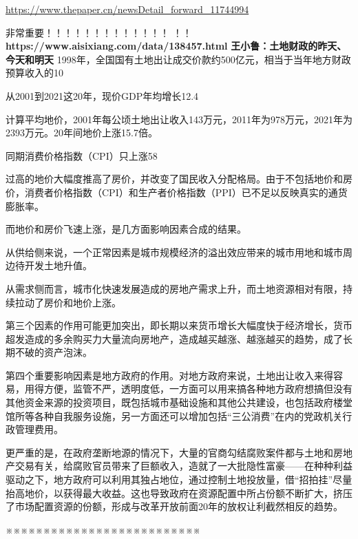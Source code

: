 \url{https://www.thepaper.cn/newsDetail_forward_11744994}


非常重要！！！！！！！！！！！！！
！！\textbf{https://www.aisixiang.com/data/138457.html}
\textbf{王小鲁：土地财政的昨天、今天和明天}
1998年，全国国有土地出让成交价款约500亿元，相当于当年地方财政预算收入的10%

从2001到2021这20年，现价GDP年均增长12.4%

计算平均地价，2001年每公顷土地出让收入143万元，2011年为978万元，2021年为2393万元。20年间地价上涨15.7倍。

同期消费价格指数（CPI）只上涨58%

过高的地价大幅度推高了房价，并改变了国民收入分配格局。由于不包括地价和房价，消费者价格指数（CPI）和生产者价格指数（PPI）已不足以反映真实的通货膨胀率。

而地价和房价飞速上涨，是几方面影响因素合成的结果。

从供给侧来说，一个正常因素是城市规模经济的溢出效应带来的城市用地和城市周边待开发土地升值。

从需求侧而言，城市化快速发展造成的房地产需求上升，而土地资源相对有限，持续拉动了房价和地价上涨。

第三个因素的作用可能更加突出，即长期以来货币增长大幅度快于经济增长，货币超发造成的多余购买力大量流向房地产，造成越买越涨、越涨越买的趋势，成了长期不破的资产泡沫。

第四个重要影响因素是地方政府的作用。对地方政府来说，土地出让收入来得容易，用得方便，监管不严，透明度低，一方面可以用来搞各种地方政府想搞但没有其他资金来源的投资项目，既包括城市基础设施和其他公共建设，也包括政府楼堂馆所等各种自我服务设施，另一方面还可以增加包括“三公消费”在内的党政机关行政管理费用。

更严重的是，在政府垄断地源的情况下，大量的官商勾结腐败案件都与土地和房地产交易有关，给腐败官员带来了巨额收入，造就了一大批隐性富豪——在种种利益驱动之下，地方政府可以利用其独占地位，通过控制土地投放量，借“招拍挂”尽量抬高地价，以获得最大收益。这也导致政府在资源配置中所占份额不断扩大，挤压了市场配置资源的份额，形成与改革开放前面20年的放权让利截然相反的趋势。

※※※※※※※※※※※※※※※※※※※※※※※※※※


